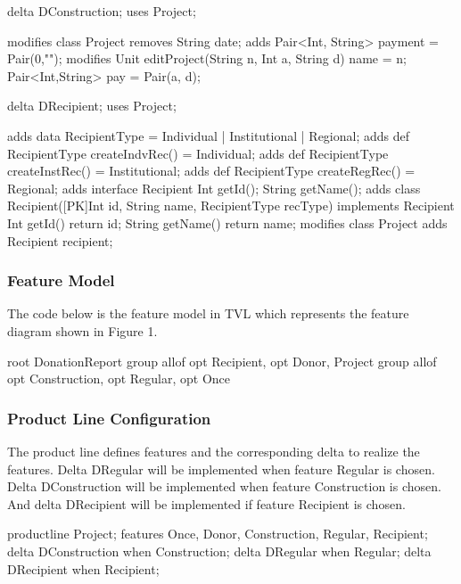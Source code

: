\documentclass[runningheads,a4paper]{llncs}
\begin{document}
\begin{abscode}
delta DConstruction;
uses Project;

modifies class Project {
	removes String date;
	adds Pair<Int, String> payment = Pair(0,"");
	modifies Unit editProject(String n, Int a, String d) {
		name = n;
		Pair<Int,String> pay = Pair(a, d);
	}
}	
\end{abscode}

\begin{abscode}
delta DRecipient;
uses Project;

adds data RecipientType = Individual | Institutional | Regional;
adds def RecipientType createIndvRec() = Individual;
adds def RecipientType createInstRec() = Institutional;
adds def RecipientType createRegRec() = Regional;
adds interface Recipient {
	Int getId();
	String getName();
}
adds class Recipient([PK]Int id, String name, RecipientType recType) 
implements Recipient {
	Int getId() { return id; }
	String getName() { return name; }
}
modifies class Project {
	adds Recipient recipient;
}
\end{abscode}

\subsubsection{Feature Model}
The code below is the feature model in \textmu TVL which represents the feature diagram shown in Figure 1.

\begin{abscode}
root DonationReport {
	group allof {
		opt Recipient,
		opt Donor,
		Project {
			group allof {
				opt Construction, 
				opt Regular, 
				opt Once 
			}
		}
	}
}
\end{abscode}

\subsubsection{Product Line Configuration}
The product line defines features and the corresponding delta to realize the features. Delta DRegular will be implemented when feature Regular is chosen. Delta DConstruction will be implemented when feature Construction is chosen. And delta DRecipient will be implemented if feature Recipient is chosen.

\begin{abscode}
productline Project;
features Once, Donor, Construction, Regular, Recipient;
delta DConstruction when Construction;
delta DRegular when Regular;
delta DRecipient when Recipient;
\end{abscode}
\end{document}

